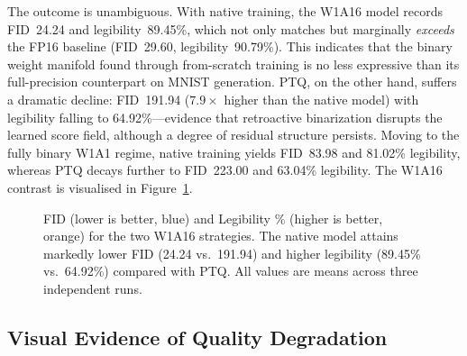 \documentclass[conference]{IEEEtran}
\begin{document}
The outcome is unambiguous. With native training, the W1A16 model records FID~24.24 and
legibility~89.45\%, which not only matches but marginally \emph{exceeds} the FP16
baseline (FID~29.60, legibility~90.79\%). This indicates that the binary weight manifold
found through from-scratch training is no less expressive than its full-precision
counterpart on MNIST generation. PTQ, on the other hand, suffers a dramatic decline:
FID~191.94 ($7.9\times$ higher than the native model) with legibility falling to
64.92\%---evidence that retroactive binarization disrupts the learned score field,
although a degree of residual structure persists. Moving to the fully binary W1A1
regime, native training yields FID~83.98 and 81.02\% legibility, whereas PTQ decays
further to FID~223.00 and 63.04\% legibility. The W1A16 contrast is visualised in
Figure~\ref{fig:chart}.

\begin{figure}[h]
\centering
{}
\caption{FID (lower is better, blue) and Legibility \% (higher is better, orange) for
the two W1A16 strategies. The native model attains markedly lower FID (24.24 vs.\
191.94) and higher legibility (89.45\% vs.\ 64.92\%) compared with PTQ. All values are
means across three independent runs.}
\label{fig:chart}
\end{figure}

\subsection{Visual Evidence of Quality Degradation}
\end{document}
